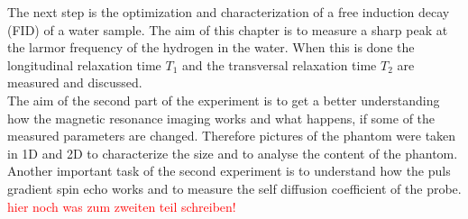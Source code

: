 The next step is the optimization and characterization of a free induction decay (FID) of a water sample.
The aim of this chapter is to measure a sharp peak at the larmor frequency of the hydrogen in the water.
When this is done the longitudinal relaxation time $T_1$ and the transversal relaxation time $T_2$ are measured and discussed.\\
The aim of the second part of the experiment is to get a better understanding how
the magnetic resonance imaging works and what happens, if some of the measured parameters are changed. Therefore pictures of the phantom were taken in 1D and 2D to characterize the size and to analyse the content of the phantom.\\
Another important task of the second experiment is to understand how the puls gradient spin echo works and to measure the self diffusion coefficient of the probe.
\textcolor{red}{hier noch was zum zweiten teil schreiben!}